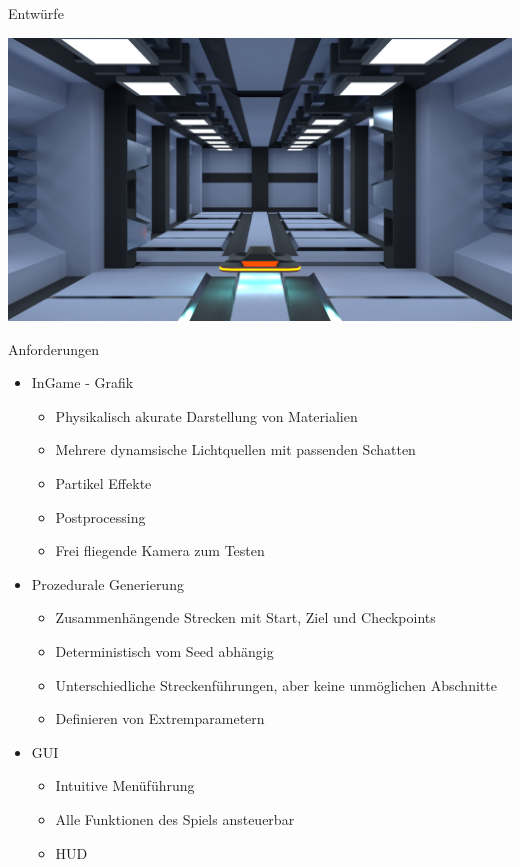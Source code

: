 \documentclass[10pt]{beamer}
\begin{document}
\begin{frame}[fragile]{Entwürfe}

  \centering\centering
  \includegraphics [width=1.0\linewidth]{./Bilder/HudMockBackground.png}

\end{frame}

\begin{frame}[fragile]{Anforderungen}
    \begin{itemize}  
        \item InGame - Grafik  
        \begin{itemize}
            \item Physikalisch akurate Darstellung von Materialien
            \item Mehrere dynamsische Lichtquellen mit passenden Schatten
            \item Partikel Effekte
            \item Postprocessing
            \item Frei fliegende Kamera zum Testen
        \end{itemize}
        \pause

        \item Prozedurale Generierung
        \begin{itemize}
            \item Zusammenhängende Strecken mit Start, Ziel und Checkpoints
            \item Deterministisch vom Seed abhängig
            \item Unterschiedliche Streckenführungen, aber keine unmöglichen Abschnitte
            \item Definieren von Extremparametern
        \end{itemize}
        \pause

        \item GUI
        \begin{itemize}
            \item Intuitive Menüführung
            \item Alle Funktionen des Spiels ansteuerbar
            \item HUD
        \end{itemize}
    \end{itemize}
\end{frame}
\end{document}
